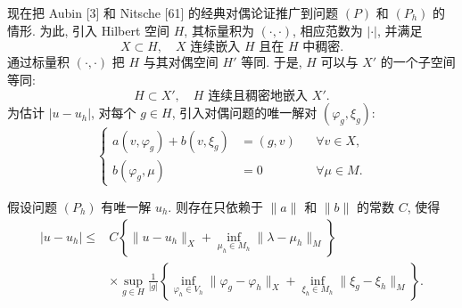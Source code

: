
现在把 Aubin [3] 和 Nitsche [61] 的经典对偶论证推广到问题 $(P)$ 和
$(P_h)$ 的情形. 为此, 引入 Hilbert 空间 $H$, 其标量积为
$(\cdot,\cdot)$, 相应范数为 $|\cdot|$, 并满足
\[
X\subset H,
\quad\text{$X$ 连续嵌入 $H$ 且在 $H$ 中稠密}.
\]
通过标量积 $(\cdot,\cdot)$ 把 $H$ 与其对偶空间 $H'$ 等同.
于是, $H$ 可以与 $X'$ 的一个子空间等同:
\[
H\subset X',
\quad\text{$H$ 连续且稠密地嵌入 $X'$}.
\]
为估计 $|u-u_h|$, 对每个 $g\in H$, 引入对偶问题的唯一解对
$(\varphi_g,\xi_g)$:
\begin{equation}\label{eq:primitive-dual-problem}
\left\{
\begin{aligned}
a(v,\varphi_g)+b(v,\xi_g)&=(g,v)
&&\forall v\in X,\\
b(\varphi_g,\mu)&=0
&&\forall\mu\in M.
\end{aligned}
\right.
\end{equation}

\setcounter{statement}{1}
\begin{Theorem}\label{thm:primitive-duality-error}
假设问题 $(P_h)$ 有唯一解 $u_h$. 则存在只依赖于 $\|a\|$ 和 $\|b\|$
的常数 $C$, 使得
\begin{equation}\label{eq:primitive-duality-error}
\begin{split}
|u-u_h|\leq{}&C\left\{
\|u-u_h\|_X+\inf_{\mu_h\in M_h}\|\lambda-\mu_h\|_M
\right\}\\
&\times\sup_{g\in H}\frac{1}{|g|}\left\{
\inf_{\varphi_h\in V_h}\|\varphi_g-\varphi_h\|_X
+\inf_{\xi_h\in M_h}\|\xi_g-\xi_h\|_M
\right\}.
\end{split}
\end{equation}
\end{Theorem}

